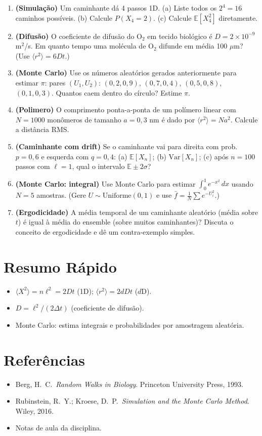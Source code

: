 \documentclass[12pt,a4paper]{article}
\begin{document}
\begin{enumerate}
  \item \textbf{(Simula\c{c}\~ao)} Um caminhante d\'a 4 passos 1D. (a) Liste todos os $2^4=16$ caminhos poss\'iveis. (b) Calcule $P(X_4 = 2)$. (c) Calcule $\mathbb{E}[X_4^2]$ diretamente.
  
  \item \textbf{(Difus\~ao)} O coeficiente de difus\~ao do O$_2$ em tecido biol\'ogico \'e $D = 2\times10^{-9}$ m$^2$/s. Em quanto tempo uma mol\'ecula de O$_2$ difunde em m\'edia 100 $\mu$m? (Use $\langle r^2\rangle = 6Dt$.)
  
  \item \textbf{(Monte Carlo)} Use os n\'umeros aleat\'orios gerados anteriormente para estimar $\pi$: pares $(U_1, U_2)$: $(0{,}2, 0{,}9)$, $(0{,}7, 0{,}4)$, $(0{,}5, 0{,}8)$, $(0{,}1, 0{,}3)$. Quantos caem dentro do c\'irculo? Estime $\pi$.
  
  \item \textbf{(Polimero)} O comprimento ponta-a-ponta de um pol\'imero linear com $N=1000$ monômeros de tamanho $a=0{,}3$ nm \'e dado por $\langle r^2\rangle = Na^2$. Calcule a dist\^ancia RMS.
  
  \item \textbf{(Caminhante com drift)} Se o caminhante vai para direita com prob.\ $p=0{,}6$ e esquerda com $q=0{,}4$: (a) $\mathbb{E}[X_n]$; (b) $\text{Var}[X_n]$; (c) ap\'os $n=100$ passos com $\ell=1$, qual o intervalo $\mathbb{E}\pm2\sigma$?
  
  \item \textbf{(Monte Carlo: integral)} Use Monte Carlo para estimar $\int_0^1 e^{-x^2}\,dx$ usando $N=5$ amostras. (Gere $U \sim \text{Uniforme}(0,1)$ e use $\bar{f} = \frac{1}{N}\sum e^{-U_i^2}$.)
  
  \item \textbf{(Ergodicidade)} A m\'edia temporal de um caminhante aleat\'orio (m\'edia sobre $t$) \'e igual \`a m\'edia do ensemble (sobre muitos caminhantes)? Discuta o conceito de ergodicidade e d\^e um contra-exemplo simples.
\end{enumerate}

\section*{Resumo R\'apido}
\begin{itemize}
  \item $\langle X^2\rangle = n\ell^2 = 2Dt$ (1D); $\langle r^2\rangle = 2dDt$ ($d$D).
  \item $D = \ell^2/(2\Delta t)$ (coeficiente de difus\~ao).
  \item Monte Carlo: estima integrais e probabilidades por amostragem aleat\'oria.
\end{itemize}

\section*{Refer\^encias}
\begin{itemize}
  \item Berg, H.\ C.\ \textit{Random Walks in Biology}. Princeton University Press, 1993.
  \item Rubinstein, R.\ Y.; Kroese, D.\ P.\ \textit{Simulation and the Monte Carlo Method}. Wiley, 2016.
  \item Notas de aula da disciplina.
\end{itemize}
\end{document}
